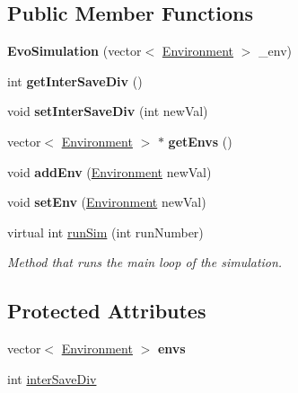 \subsection*{Public Member Functions}
\begin{DoxyCompactItemize}
\item 
\mbox{\label{classEvoSimulation_ad9c067c5d931cef3485671c652340fed}} 
{\bfseries Evo\+Simulation} (vector$<$ \hyperlink{classEnvironment}{Environment} $>$ \+\_\+env)
\item 
\mbox{\label{classEvoSimulation_ad355ec692640389831d0f70ee5336371}} 
int {\bfseries get\+Inter\+Save\+Div} ()
\item 
\mbox{\label{classEvoSimulation_afcd50bb904037e0ed92f82db5bce4706}} 
void {\bfseries set\+Inter\+Save\+Div} (int new\+Val)
\item 
\mbox{\label{classEvoSimulation_abc143157a5ee313cd04375e0b11fd25d}} 
vector$<$ \hyperlink{classEnvironment}{Environment} $>$ $\ast$ {\bfseries get\+Envs} ()
\item 
\mbox{\label{classEvoSimulation_ae2c4e68c8181696f5c524c9f09f29421}} 
void {\bfseries add\+Env} (\hyperlink{classEnvironment}{Environment} new\+Val)
\item 
\mbox{\label{classEvoSimulation_ae075e1877fb4c1132f4630a85ed5fcbf}} 
void {\bfseries set\+Env} (\hyperlink{classEnvironment}{Environment} new\+Val)
\item 
virtual int \hyperlink{classEvoSimulation_aa43aa351dec24c638e56995a67a4f0f5}{run\+Sim} (int run\+Number)
\begin{DoxyCompactList}\small\item\em Method that runs the main loop of the simulation. \end{DoxyCompactList}\end{DoxyCompactItemize}
\subsection*{Protected Attributes}
\begin{DoxyCompactItemize}
\item 
\mbox{\label{classEvoSimulation_ac75fd2b2c9fb588adb138c0c0aaebe4d}} 
vector$<$ \hyperlink{classEnvironment}{Environment} $>$ {\bfseries envs}
\item 
int \hyperlink{classEvoSimulation_aced0330991a4c4ed3bf726e5909fbd31}{inter\+Save\+Div}
\end{DoxyCompactItemize}


